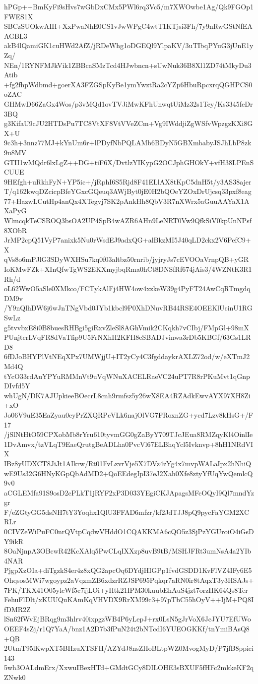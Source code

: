 hPGp++BmKyFi9sHvs7wGbDxCMx5PWl6rq3Vc5/m7XWOwbe1Ag/Qk9FGOp1FWES1X
SBCzSUOkwAIH+XxPwaNhE0CS1vJwWPgC4wtT1KTjsi3Fh/7y9nRwGStNfEAAGBL3
akB4lQamiGK1cuHWd2AfZ/jRDeWhg1oDGEQl9YlpaKV/3uTIbqPYuG3jUnE1yZq/
NEn/1RYNFMJkVik1ZBBcaSMzTcd4HJwbncn+sUwNuk36B8Xl1ZD74tMkyDu3Atib
+fg2fhpWdbmd+goerXA3FZGSpKyBe1ymYwztRa2cYZp6HbuRpcxrqQGHPCS0oZAC
GHMwD66ZaGx4Wos/p3vMQd1ovTVJiMwKFhUnwqtUiMz32s1Tey/Ks3345feDr3BQ
g3KifaU9cJU2HTDsPu7TC8VtXF8VtVVeZCm+Vg9IWddjiZgWSfvWpzgzKXi8GX+U
9c3h+3nnz77MJ+kYnUm6r+lPDyfNbPQLAMb6BDyN5GBXmbabyJSJhLbP8zk9u8MV
GTII1wMQdr6lxLgZ++DG+tiF6X/DvtlzYIKypG2OCJphGHOkY+vfH38LPEnSCUUE
9HEfgh+uRkhFyN+YP5ic+/jRphI6S5Rjd8F41ELlAX8tKpC5dnH5t/y3AS38ajer
T/q162kwqDZcicpBfeYGxcGQeuq3AWjByt0jE0H2bQOeYZOxDrUjcsq33pxf8eag
77+HazwLCutHp4anQx4XTegvj7SK2pAnkHh8QbV3R7nXWrx5aGuuAAYaX1AXaPyG
WlmcqkTeCSROQ3bsOA2UP4SpB4wAZR6AHn9LeNRT0Vw9QfkSiV0kpUnNPsf8XObR
JrMP2cpQ51VyP7anixk5Nu0rWsdEJ9adxQG+alBkzMI5J40qLD2ckx2V6PefC9+X
qVs8o6mPJlG3SDyWXHSu7kq0f03altbz50rnrib/jyjryJs7cEVOOaVrnpQB+yGR
IoKMwFZk+XInQfwTgWS2EKXmyjbqRma0hCt8DNSfRf674jAis3/4WZNtK3R1Rh/d
oL62WwO5aSle0XMkco/FCTykAlFj4HW4ow4xzkeW39g4PyFT24AwCqRTmgdqDM9v
/Y9nQlhDW6j6wJnTNgVbd0JYb1kbcl9P0XhDNuvRB44RSE4OEEKlUcinU1RGSwLz
g5tvvbxE8i0B8buesRHBgi5giRxvZleSl8AGhVmik2CKqkh7vCIbj/FMpGl+98mX
PUnjtcrLVqFR8dVaTfip9U5FrNXhH2KFH8eSBADJvinwa3rDb5KBGf/63Gs1LRD8
6fDJoBHYPlVtNEqXPx7UMWjjU+IT2yCy4C3fgddaykrAXLZ72od/w/eXTmJ2Md4Q
tYcO33rdAuYPYuRMMnVt9uVqWNuXACELRaeVC24uPT7R8rPKuMvt1qGnpDIvfd5Y
whUgN/DK7AJUpkieeBOecrL8cnh9rmfsz5y26wX8EA4RZAdkEwvAYX97XH8Zi+xO
Jo06V9uE35EaZyau0eyPrZXQRPcVLk6najOlVG7FRoxnZG+ycd7Lzv8kHsG+/F17
/jSlNtHtO59CPXobMb8rYru610tyvmGG0gZaByY709TJcJEua8RMZqyKl4OinlIe
1DvAmvx/tzVLqT9EaeQrutgBeADLha0PvcVl67ELBhqYcl5Ivknvp+8hH1NRdVIX
IBz8yUDXCT8JiJt1AIkrw/Rt01FvLzvrVje5X7DVz4zYg4x7mvpWALaIpx2hNhiQ
wE9Us32G6HNyKGpQbAdMD2+QoEEdegIpI37eJ2Xah0Xfe8ztyYfUqYwQemlcQ9v0
aCGLEMfa91S9osD2cPLkT1jRYF2xP3D033YEgiCKJApagsMFcOQyI9Ql7mndYzgr
F/eZGtyGG5dsNH7tY3Yoqhx1QlU3FFAD6mfzr/kf2JdTJJ8pQ9pycFaYGM2XCRLr
0CIVZeWiPuFC0nrQVtpCqdwVHddO1CQAKKMA6cQO5z3SjPzYGUroiO4iGsDY9ikR
8OaNjnpA3OBcwR42KcXAlq5PwCLqIXXzp8uvB9tB/MSHJFRt3umNsA4a2YIb4NAR
PjgpXzOIa+diTgzkS4er4z8xQG2apcOq6DYdjHIGPp1fvdGSDD1KvFlVZ4IFy6E5
OhqsosMWi7wgoypz2aVqzmZB6xdzrRZJSP695Pqkqr7aRN0ir8tAqxT3y3HSAJs+
7PK/TKX41O05ylcWf5c7ijLOi+yHtk21IPM30kuubEhAuS4jzt7orzHK64Qs8Ter
FehuFlDlt/xKUUQuKAmKqVHVDX9RrXM99c3+97pTbC55hOyV++IjM+PQ8IfDMR2Z
lSn62fWvEjBRqg9m3hlrv40ixpgzWB4P6yLepJ+rx0LsN5gJrVoX6JcJYU7EfUWo
OEEF4sZj/r1Q7YaA/bnz1A2D7b3fPuN24t2bNTcdI6YUEOGKKf/tnYmiBAsQ8+QB
2UtmT95lKwpXT5BHzuXTSFH/AZYdJ8nsZHoBLtpWZ0MvogMyD/P7jfB8ppiei143
5wh3OALdmErx/XxwuIBexHTd+GMdtGCy8DILOHE3sBXUF5fHFc2mkkeKF2qZNwk0
